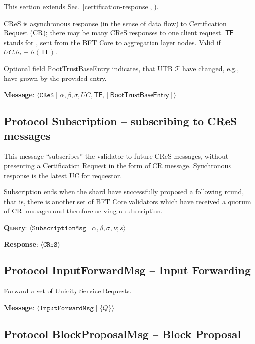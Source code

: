 This section extends Sec.~\ref{certification-response}, ).

CReS is asynchronous response (in the sense of data flow) to Certification Request (CR); there may be many CReS responses to one client request. $\mathsf{TE}$ stands for , sent from the BFT Core to aggregation layer nodes. Valid if $UC.h_t = h(\mathsf{TE})$.

Optional field RootTrustBaseEntry indicates, that UTB $\mathcal{T}$ have changed, e.g., have grown by the provided entry.

\textbf{Message}: $\langle \texttt{CReS} \mid \alpha, \beta, \sigma, UC, \mathsf{TE}, [\textsf{RootTrustBaseEntry}]\rangle$


\subsection{Protocol Subscription -- subscribing to CReS messages}

This message ``subscribes'' the validator to future CReS messages, without presenting a Certification Request in the form of CR message. Synchronous response is the latest UC for requestor.

Subscription ends when the shard have successfully proposed a following round, that is, there is another set of BFT Core validators which have received a quorum of CR messages and therefore serving a subscription.

\textbf{Query}: $\langle \texttt{SubscriptionMsg} \mid \alpha, \beta, \sigma, \nu; s \rangle$

\textbf{Response}: $\langle \texttt{CReS} \rangle$


\subsection{Protocol InputForwardMsg -- Input Forwarding}\label{protocol-pc1-i-input-forwarding}

Forward a set of Unicity Service Requests.

\textbf{Message}: $\langle \texttt{InputForwardMsg} \mid \{Q\}\rangle$


\subsection{Protocol BlockProposalMsg -- Block Proposal}\label{protocol-pc1-o-block-proposal}

